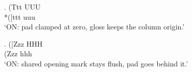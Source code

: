\ex. \gll (Ttt UUU \\
     *([ttt uuu \\
\glt `ON: pad clamped at zero, gloss keeps the column origin.'

\ex. \gll ([Zzz HHH \\
     (Zzz hhh \\
\glt `ON: shared opening mark stays flush, pad goes behind it.'


